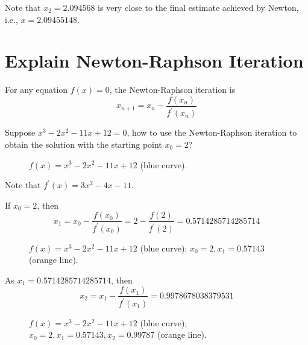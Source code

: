 \documentclass[12pt]{article}
\begin{document}
Note that $x_2=2.094568$ is very close to the final estimate achieved by Newton, i.e., $x=2.09455148$.

\clearpage

\section{Explain Newton-Raphson Iteration}

For any equation $f(x)=0$, the Newton-Raphson iteration is
\begin{equation*}
x_{n+1}=x_{n}-\frac{f(x_{n})}{f^\prime(x_{n})}
\end{equation*}

Suppose $x^3-2x^2-11x+12=0$, how to use the Newton-Raphson iteration to obtain the solution with the starting point $x_0=2$?

\begin{figure}[h]
    \centering
    
    \caption{{\color{blue}$f(x)=x^3-2x^2-11x+12$} (blue curve).}
\end{figure}

Note that $f^\prime(x)=3x^2-4x-11$.

If $x_0=2$, then
\begin{equation*}
x_1=x_{0}-\frac{f(x_{0})}{f^\prime(x_{0})}=2-\frac{f(2)}{f^\prime(2)}=0.5714285714285714
\end{equation*}

\begin{figure}[h]
    \centering
    
    \caption{{\color{blue}$f(x)=x^3-2x^2-11x+12$} (blue curve); {\color{orange}$x_0=2,x_1=0.57143$} (orange line).}
\end{figure}

\clearpage

As $x_1=0.5714285714285714$, then
\begin{equation*}
x_2=x_{1}-\frac{f(x_{1})}{f^\prime(x_{1})}=0.9978678038379531
\end{equation*}

\begin{figure}[h]
    \centering
    
    \caption{{\color{blue}$f(x)=x^3-2x^2-11x+12$} (blue curve); {\color{orange}$x_0=2,x_1=0.57143,x_2=0.99787$} (orange line).}
\end{figure}
\end{document}
